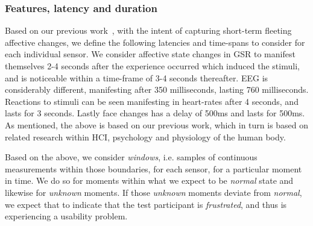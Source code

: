 \subsubsection{Features, latency and duration}
Based on our previous work~\cite{9th_semester_project, first_paper}, with the intent of capturing short-term fleeting affective changes, we define the following
latencies and time-spans to consider for each individual sensor.
We consider affective state changes in GSR to manifest themselves 2-4 seconds after the experience occurred which
induced the stimuli, and is noticeable within a time-frame of 3-4 seconds thereafter. EEG is considerably different,
manifesting after 350 milliseconds, lasting 760 milliseconds. Reactions to stimuli can be seen manifesting in heart-rates
after 4 seconds, and lasts for 3 seconds. Lastly face changes has a delay of 500ms and lasts for 500ms. As mentioned,
the above is based on our previous work, which in turn is based on related research within HCI, psychology and
physiology of the human body.

Based on the above, we consider \textit{windows}, i.e. samples of continuous measurements within those boundaries, for
each sensor, for a particular moment in time. We do so for moments within what we expect to be \textit{normal} state and
likewise for \textit{unknown} moments. If those \textit{unknown} moments deviate from \textit{normal}, we expect that to
indicate that the test participant is \textit{frustrated}, and thus is experiencing a usability problem.

